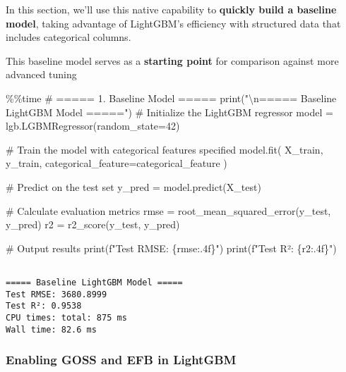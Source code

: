 \documentclass[
  letterpaper,
  DIV=11,
  numbers=noendperiod]{scrreprt}
\newenvironment{Shaded}{\begin{snugshade}}{\end{snugshade}}
\newcommand{\BuiltInTok}[1]{\textcolor[rgb]{0.00,0.23,0.31}{#1}}
\newcommand{\CharTok}[1]{\textcolor[rgb]{0.13,0.47,0.30}{#1}}
\newcommand{\CommentTok}[1]{\textcolor[rgb]{0.37,0.37,0.37}{#1}}
\newcommand{\DecValTok}[1]{\textcolor[rgb]{0.68,0.00,0.00}{#1}}
\newcommand{\NormalTok}[1]{\textcolor[rgb]{0.00,0.23,0.31}{#1}}
\newcommand{\OperatorTok}[1]{\textcolor[rgb]{0.37,0.37,0.37}{#1}}
\newcommand{\SpecialCharTok}[1]{\textcolor[rgb]{0.37,0.37,0.37}{#1}}
\newcommand{\SpecialStringTok}[1]{\textcolor[rgb]{0.13,0.47,0.30}{#1}}
\newcommand{\StringTok}[1]{\textcolor[rgb]{0.13,0.47,0.30}{#1}}
\begin{document}
In this section, we'll use this native capability to \textbf{quickly
build a baseline model}, taking advantage of LightGBM's efficiency with
structured data that includes categorical columns.

This baseline model serves as a \textbf{starting point} for comparison
against more advanced tuning

\begin{Shaded}
\begin{Highlighting}[]
\OperatorTok{\%\%}\NormalTok{time}
\CommentTok{\# ===== 1. Baseline Model =====}
\BuiltInTok{print}\NormalTok{(}\StringTok{"}\CharTok{\textbackslash{}n}\StringTok{===== Baseline LightGBM Model ====="}\NormalTok{)}
\CommentTok{\# Initialize the LightGBM regressor}
\NormalTok{model }\OperatorTok{=}\NormalTok{ lgb.LGBMRegressor(random\_state}\OperatorTok{=}\DecValTok{42}\NormalTok{)}

\CommentTok{\# Train the model with categorical features specified}
\NormalTok{model.fit(}
\NormalTok{    X\_train, }
\NormalTok{    y\_train,}
\NormalTok{    categorical\_feature}\OperatorTok{=}\NormalTok{categorical\_feature}
\NormalTok{)}

\CommentTok{\# Predict on the test set}
\NormalTok{y\_pred }\OperatorTok{=}\NormalTok{ model.predict(X\_test)}

\CommentTok{\# Calculate evaluation metrics}
\NormalTok{rmse }\OperatorTok{=}\NormalTok{ root\_mean\_squared\_error(y\_test, y\_pred)}
\NormalTok{r2 }\OperatorTok{=}\NormalTok{ r2\_score(y\_test, y\_pred)}

\CommentTok{\# Output results}
\BuiltInTok{print}\NormalTok{(}\SpecialStringTok{f"Test RMSE: }\SpecialCharTok{\{}\NormalTok{rmse}\SpecialCharTok{:.4f\}}\SpecialStringTok{"}\NormalTok{)}
\BuiltInTok{print}\NormalTok{(}\SpecialStringTok{f"Test R²: }\SpecialCharTok{\{}\NormalTok{r2}\SpecialCharTok{:.4f\}}\SpecialStringTok{"}\NormalTok{)}
\end{Highlighting}
\end{Shaded}

\begin{verbatim}

===== Baseline LightGBM Model =====
Test RMSE: 3680.8999
Test R²: 0.9538
CPU times: total: 875 ms
Wall time: 82.6 ms
\end{verbatim}

\subsubsection{Enabling GOSS and EFB in
LightGBM}\label{enabling-goss-and-efb-in-lightgbm}
\end{document}

